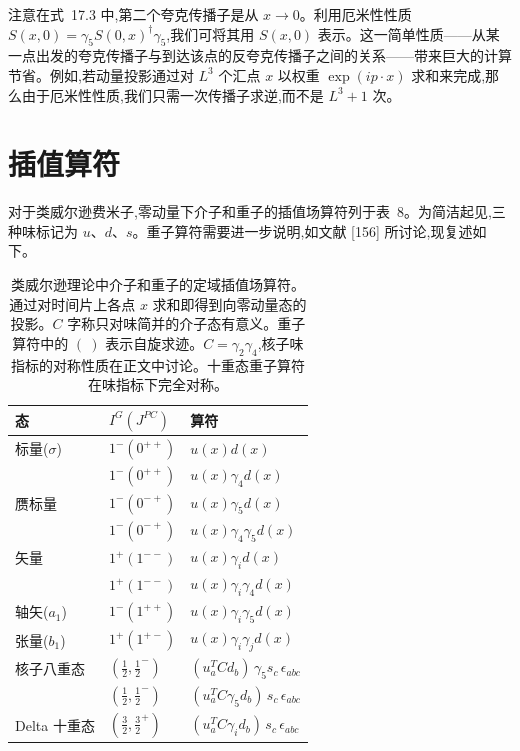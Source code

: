 注意在式~17.3 中,第二个夸克传播子是从 $x \to 0$。利用厄米性性质 $S(x,0) = \gamma_5 S(0,x)^\dagger \gamma_5$,我们可将其用 $S(x,0)$ 表示。这一简单性质——从某一点出发的夸克传播子与到达该点的反夸克传播子之间的关系——带来巨大的计算节省。例如,若动量投影通过对 $L^3$ 个汇点 $x$ 以权重 $\exp(ip\cdot x)$ 求和来完成,那么由于厄米性性质,我们只需一次传播子求逆,而不是 $L^3+1$ 次。

\section{插值算符}

对于类威尔逊费米子,零动量下介子和重子的插值场算符列于表~8。为简洁起见,三种味标记为 $u$、$d$、$s$。重子算符需要进一步说明,如文献 [156] 所讨论,现复述如下。

\begin{table}[htbp]
\centering
\begin{tabular}{lll}
\toprule
态 & $I^G(J^{PC})$ & 算符 \\
\midrule
标量($\sigma$) & $1^-(0^{++})$ & $u(x)d(x)$ \\
                  & $1^-(0^{++})$ & $u(x)\gamma_4 d(x)$ \\
赝标量      & $1^-(0^{-+})$ & $u(x)\gamma_5 d(x)$ \\
                  & $1^-(0^{-+})$ & $u(x)\gamma_4\gamma_5 d(x)$ \\
矢量            & $1^+(1^{--})$ & $u(x)\gamma_i d(x)$ \\
                  & $1^+(1^{--})$ & $u(x)\gamma_i\gamma_4 d(x)$ \\
轴矢($a_1$)     & $1^-(1^{++})$ & $u(x)\gamma_i\gamma_5 d(x)$ \\
张量($b_1$)    & $1^+(1^{+-})$ & $u(x)\gamma_i\gamma_j d(x)$ \\
\midrule
核子八重态     & $(\tfrac{1}{2},\tfrac{1}{2}^-)$ & $(u_a^T C d_b)\,\gamma_5 s_c\,\epsilon_{abc}$ \\
                  & $(\tfrac{1}{2},\tfrac{1}{2}^-)$ & $(u_a^T C\gamma_5 d_b)\,s_c\,\epsilon_{abc}$ \\
Delta 十重态    & $(\tfrac{3}{2},\tfrac{3}{2}^+)$ & $(u_a^T C\gamma_i d_b)\,s_c\,\epsilon_{abc}$ \\
\bottomrule
\end{tabular}
\caption{类威尔逊理论中介子和重子的定域插值场算符。通过对时间片上各点 $x$ 求和即得到向零动量态的投影。$C$ 字称只对味简并的介子态有意义。重子算符中的 $(\ )$ 表示自旋求迹。$C = \gamma_2\gamma_4$,核子味指标的对称性质在正文中讨论。十重态重子算符在味指标下完全对称。}
\label{tab:8}
\end{table}

